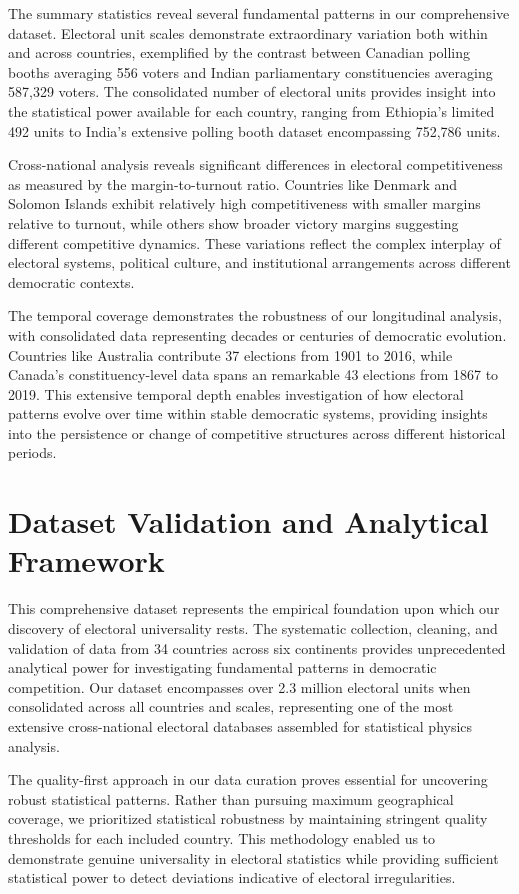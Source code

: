 The summary statistics reveal several fundamental patterns in our comprehensive dataset. Electoral unit scales demonstrate extraordinary variation both within and across countries, exemplified by the contrast between Canadian polling booths averaging 556 voters and Indian parliamentary constituencies averaging 587,329 voters. The consolidated number of electoral units provides insight into the statistical power available for each country, ranging from Ethiopia's limited 492 units to India's extensive polling booth dataset encompassing 752,786 units.

Cross-national analysis reveals significant differences in electoral competitiveness as measured by the margin-to-turnout ratio. Countries like Denmark and Solomon Islands exhibit relatively high competitiveness with smaller margins relative to turnout, while others show broader victory margins suggesting different competitive dynamics. These variations reflect the complex interplay of electoral systems, political culture, and institutional arrangements across different democratic contexts.

The temporal coverage demonstrates the robustness of our longitudinal analysis, with consolidated data representing decades or centuries of democratic evolution. Countries like Australia contribute 37 elections from 1901 to 2016, while Canada's constituency-level data spans an remarkable 43 elections from 1867 to 2019. This extensive temporal depth enables investigation of how electoral patterns evolve over time within stable democratic systems, providing insights into the persistence or change of competitive structures across different historical periods.

\section{Dataset Validation and Analytical Framework}

This comprehensive dataset represents the empirical foundation upon which our discovery of electoral universality rests. The systematic collection, cleaning, and validation of data from 34 countries across six continents provides unprecedented analytical power for investigating fundamental patterns in democratic competition. Our dataset encompasses over 2.3 million electoral units when consolidated across all countries and scales, representing one of the most extensive cross-national electoral databases assembled for statistical physics analysis.

The quality-first approach in our data curation proves essential for uncovering robust statistical patterns. Rather than pursuing maximum geographical coverage, we prioritized statistical robustness by maintaining stringent quality thresholds for each included country. This methodology enabled us to demonstrate genuine universality in electoral statistics while providing sufficient statistical power to detect deviations indicative of electoral irregularities.

